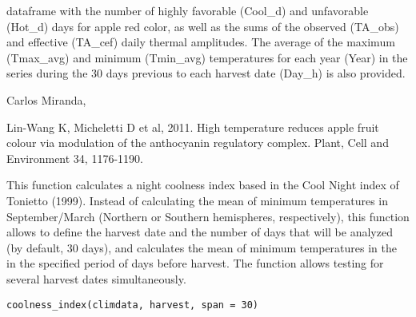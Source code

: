 \documentclass[a4paper]{book}
\begin{document}
%
\begin{Value}
dataframe with the number of highly favorable (Cool\_d) 
and unfavorable (Hot\_d) days for apple red color, as well as the sums of
the observed (TA\_obs) and effective (TA\_cef) daily thermal amplitudes.
The average of the maximum (Tmax\_avg) and minimum (Tmin\_avg) 
temperatures for each year (Year) in the series during the 
30 days previous to each harvest date (Day\_h) is also provided.
\end{Value}
%
\begin{Author}\relax
Carlos Miranda, 
\end{Author}
%
\begin{References}\relax
Lin-Wang K, Micheletti D et al, 2011. High temperature reduces apple fruit
colour via modulation of the anthocyanin regulatory complex. Plant, Cell
and Environment 34, 1176-1190.
\end{References}
%
\begin{Examples}
\end{Examples}
%
\begin{Description}\relax
This function calculates a night coolness index based in the
Cool Night index of Tonietto (1999). Instead of calculating 
the mean of minimum temperatures in September/March (Northern
or Southern hemispheres, respectively), this function allows 
to define the harvest date and the number of days that will be
analyzed (by default, 30 days), and calculates the mean of minimum
temperatures in the in the specified period of days before harvest.
The function allows testing for several harvest dates simultaneously.
\end{Description}
%
\begin{Usage}
\begin{verbatim}
coolness_index(climdata, harvest, span = 30)
\end{verbatim}
\end{Usage}
\end{document}
